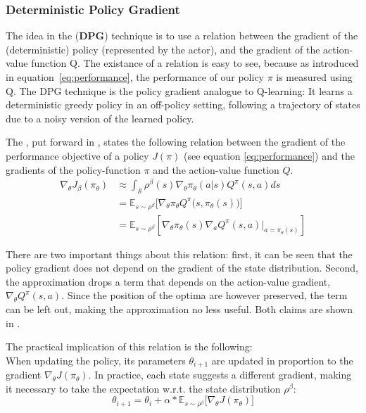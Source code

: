 \subsubsection{Deterministic Policy Gradient}

The idea in the  (\textbf{DPG}) technique is to use a relation between the gradient of the (deterministic) policy (represented by the actor), and the gradient of the action-value function Q. The existance of a relation is easy to see, because as introduced in equation~\ref{eq:performance}, the performance of our policy $\pi$ is measured using Q. The DPG technique is the policy gradient analogue to Q-learning: It learns a deterministic greedy policy in an off-policy setting, following a trajectory of states due to a noisy version of the learned policy.

The , put forward in \cite{silver_deterministic_2014}, states the following relation between the gradient of the performance objective of a policy $J(\pi)$ (see equation \ref{eq:performance}) and the gradients of the policy-function $\pi$ and the action-value function $Q$. 
\begin{align}
	\nabla_{\theta}J_\beta(\pi_\theta) &\approx \int_{\mathcal{S}} \rho^\beta(s) \nabla_\theta \pi_{\theta}(a|s)Q^\pi(s,a) ds \nonumber \\
	    &= \mathds{E}_{s\sim\rho^\beta} \Big[ \nabla_\theta \pi_\theta Q^\pi \big(s,\pi_\theta(s)\big)   \Big] \nonumber \\
		&= \mathds{E}_{s\sim\rho^\beta} \left[  \nabla_\theta \pi_{\theta}(s) \nabla_a Q^\pi(s,a) \big|_{a=\pi_\theta(s)} \right]  \label{eq:dpg}
\end{align}
\begin{flushright}
	\small There are two important things about this relation: first, it can be seen that the policy gradient does not depend on the gradient of the state distribution. Second, the approximation drops a term that depends on the action-value gradient, $\nabla_{\theta} Q^\pi(s,a)$. Since the position of the optima are however preserved, the term can be left  out, making the approximation no less useful. Both claims are shown in \cite{silver_deterministic_2014}.\\ 
\end{flushright}

\noindent The practical implication of this relation is the following:\\
\noindent When updating the policy, its parameters $\theta_{i+1}$ are updated in proportion to the gradient $\nabla_{\theta}J(\pi_\theta)$. In practice, each state suggests a different gradient, making it necessary to take the expectation w.r.t. the state distribution $\rho^\beta$: 
\begin{equation*}
	\theta_{i+1} = \theta_i + \alpha * \mathds{E}_{s\sim\rho^\beta} \big[ \nabla_{\theta}J(\pi_\theta) \big]
\end{equation*}

